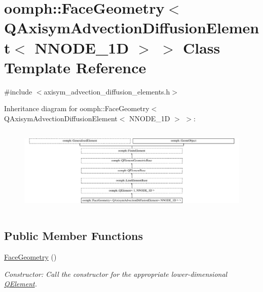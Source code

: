 \hypertarget{classoomph_1_1FaceGeometry_3_01QAxisymAdvectionDiffusionElement_3_01NNODE__1D_01_4_01_4}{}\section{oomph\+:\+:Face\+Geometry$<$ Q\+Axisym\+Advection\+Diffusion\+Element$<$ N\+N\+O\+D\+E\+\_\+1D $>$ $>$ Class Template Reference}
\label{classoomph_1_1FaceGeometry_3_01QAxisymAdvectionDiffusionElement_3_01NNODE__1D_01_4_01_4}


{\ttfamily \#include $<$axisym\+\_\+advection\+\_\+diffusion\+\_\+elements.\+h$>$}

Inheritance diagram for oomph\+:\+:Face\+Geometry$<$ Q\+Axisym\+Advection\+Diffusion\+Element$<$ N\+N\+O\+D\+E\+\_\+1D $>$ $>$\+:\begin{figure}[H]
\begin{center}
\leavevmode
\includegraphics[height=4.233262cm]{classoomph_1_1FaceGeometry_3_01QAxisymAdvectionDiffusionElement_3_01NNODE__1D_01_4_01_4}
\end{center}
\end{figure}
\subsection*{Public Member Functions}
\begin{DoxyCompactItemize}
\item 
\hyperlink{classoomph_1_1FaceGeometry_3_01QAxisymAdvectionDiffusionElement_3_01NNODE__1D_01_4_01_4_a7c174f03870a2be3a784a71044ae2810}{Face\+Geometry} ()
\begin{DoxyCompactList}\small\item\em Constructor\+: Call the constructor for the appropriate lower-\/dimensional \hyperlink{classoomph_1_1QElement}{Q\+Element}. \end{DoxyCompactList}\end{DoxyCompactItemize}
